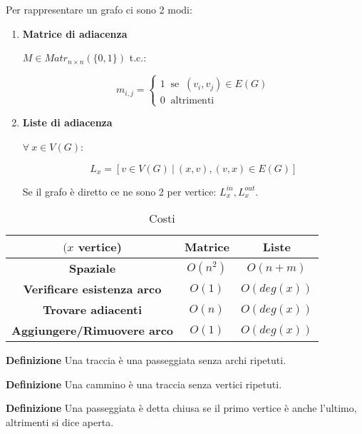 \documentclass{article}
\begin{document}
\noindent Per rappresentare un grafo ci sono 2 modi:
\begin{enumerate}
    \item \textbf{Matrice di adiacenza}

        $M\in Matr_{n\times n}(\{0,1\})$ t.c.:

        \[m_{i,j}=
        \begin{cases}
            1\ \text{ se }\ (v_i,v_j)\in E(G)\\
            0\ \text{ altrimenti}
        \end{cases}
        \]
    
    \item \textbf{Liste di adiacenza}

        $\forall\ x\in V(G)$:

        $$L_x=[v\in V(G)\ |\ (x,v),(v,x)\in E(G)]$$

        Se il grafo è diretto ce ne sono 2 per vertice: $L_x^{in},L_x^{out}$.\newline
    
\end{enumerate}

\begin{table}[ht]
    \centering
    \begin{tabular}{c|c|c}
        $(x$ vertice) & \textbf{Matrice} & \textbf{Liste}\\
         \hline
        \rule{0pt}{3ex}\textbf{Spaziale} & $O(n^2)$ & $O(n+m)$\\
         \hline
        \rule{0pt}{3ex}\textbf{Verificare esistenza arco} & $O(1)$ & $O(deg(x))$\\
         \hline
        \rule{0pt}{3ex}\textbf{Trovare adiacenti} & $O(n)$ & $O(deg(x))$\\
         \hline
        \rule{0pt}{3ex}\textbf{Aggiungere/Rimuovere arco} & $O(1)$ & $O(deg(x))$\\
    \end{tabular}
    \caption{Costi}
    \label{tab:costi_grafo}
\end{table}

\noindent\textbf{Definizione} Una traccia è una passeggiata senza archi ripetuti.\newline

\noindent\textbf{Definizione} Una cammino è una traccia senza vertici ripetuti.\newline

\noindent\textbf{Definizione} Una passeggiata è detta chiusa se il primo vertice è anche l'ultimo, altrimenti si dice aperta.\newline
\end{document}
